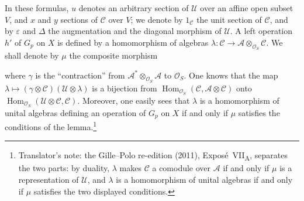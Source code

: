 In these formulas, \(u\) denotes an arbitrary section of \(\mathcal U\)
over an affine open subset \(V\), and \(x\) and \(y\) sections of
\(\mathcal C\) over \(V\); we denote by \(1_{\mathcal C}\) the unit
section of \(\mathcal C\), and by \(\varepsilon\) and \(\Delta\) the
augmentation and the diagonal morphism of \(\mathcal U\). A left operation
\(h'\) of \(G_p\) on \(X\) is defined by a homomorphism of algebras
\(\lambda:\mathcal C\to\mathcal A\otimes_{\mathcal O_S}\mathcal C\). We
shall denote by \(\mu\) the composite morphism
\begin{center}
  \label{sga3:VIIA:7.2.1-action-contraction-composite}
  
\end{center}
where \(\gamma\) is the ``contraction'' from
\(\mathcal A^{*}\otimes_{\mathcal O_S}\mathcal A\) to \(\mathcal O_S\).
One knows that the map
\(\lambda\mapsto(\gamma\otimes\mathcal C)(\mathcal U\otimes\lambda)\) is a
bijection from
\(\operatorname{Hom}_{\mathcal O_S}(\mathcal C,\mathcal A\otimes\mathcal C)\)
onto
\(\operatorname{Hom}_{\mathcal O_S}(\mathcal U\otimes\mathcal C,\mathcal C)\).
Moreover, one easily sees that \(\lambda\) is a homomorphism of unital
algebras defining an operation of \(G_p\) on \(X\) if and only if \(\mu\)
satisfies the conditions of the lemma.\footnote{Translator's note: the
Gille--Polo re-edition (2011), Expos\'e~VII\textsubscript{A}, separates the
two parts: by duality, \(\lambda\) makes \(\mathcal C\) a comodule over
\(\mathcal A\) if and only if \(\mu\) is a representation of
\(\mathcal U\), and \(\lambda\) is a homomorphism of unital algebras if
and only if \(\mu\) satisfies the two displayed conditions.}

